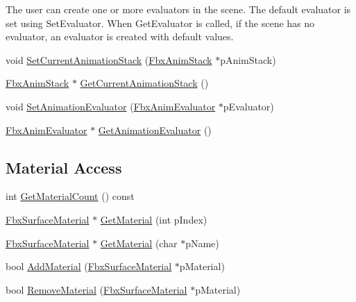 The user can create one or more evaluators in the scene. The default evaluator is set using Set\+Evaluator. When Get\+Evaluator is called, if the scene has no evaluator, an evaluator is created with default values. \begin{DoxyCompactItemize}
\item 
void \hyperlink{class_fbx_scene_a19f5408a6460667dec584cd5363e3abe}{Set\+Current\+Animation\+Stack} (\hyperlink{class_fbx_anim_stack}{Fbx\+Anim\+Stack} $\ast$p\+Anim\+Stack)
\item 
\hyperlink{class_fbx_anim_stack}{Fbx\+Anim\+Stack} $\ast$ \hyperlink{class_fbx_scene_af8fde6643714a5e654e1e28d6f5470f9}{Get\+Current\+Animation\+Stack} ()
\item 
void \hyperlink{class_fbx_scene_a7fd2f5602c943f1050488e379fc18755}{Set\+Animation\+Evaluator} (\hyperlink{class_fbx_anim_evaluator}{Fbx\+Anim\+Evaluator} $\ast$p\+Evaluator)
\item 
\hyperlink{class_fbx_anim_evaluator}{Fbx\+Anim\+Evaluator} $\ast$ \hyperlink{class_fbx_scene_a6938500794b26f33a0a56a1ea4ce4a61}{Get\+Animation\+Evaluator} ()
\end{DoxyCompactItemize}
\subsection*{Material Access}
\begin{DoxyCompactItemize}
\item 
int \hyperlink{class_fbx_scene_a098bcfeab04d64d1b7f900a09c09f381}{Get\+Material\+Count} () const
\item 
\hyperlink{class_fbx_surface_material}{Fbx\+Surface\+Material} $\ast$ \hyperlink{class_fbx_scene_aec766862a775be507f785d75ddc55cf5}{Get\+Material} (int p\+Index)
\item 
\hyperlink{class_fbx_surface_material}{Fbx\+Surface\+Material} $\ast$ \hyperlink{class_fbx_scene_ad99587afc86a025c65fd150dcdbf885b}{Get\+Material} (char $\ast$p\+Name)
\item 
bool \hyperlink{class_fbx_scene_a65586b64256e236b0e0f2d885ca985e2}{Add\+Material} (\hyperlink{class_fbx_surface_material}{Fbx\+Surface\+Material} $\ast$p\+Material)
\item 
bool \hyperlink{class_fbx_scene_a901ad0c4394b3ee5bf675ee91e54adc0}{Remove\+Material} (\hyperlink{class_fbx_surface_material}{Fbx\+Surface\+Material} $\ast$p\+Material)
\end{DoxyCompactItemize}
